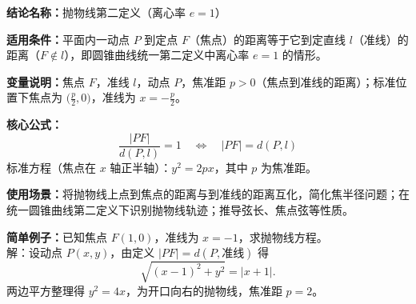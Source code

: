 \textbf{结论名称：}抛物线第二定义（离心率 \(e=1\)）

\textbf{适用条件：}平面内一动点 \(P\) 到定点 \(F\)（焦点）的距离等于它到定直线 \(l\)（准线）的距离（\(F\notin l\)），即圆锥曲线统一第二定义中离心率 \(e=1\) 的情形。

\textbf{变量说明：}焦点 \(F\)，准线 \(l\)，动点 \(P\)，焦准距 \(p>0\)（焦点到准线的距离）；标准位置下焦点为 \(\bigl(\frac{p}{2},0\bigr)\)，准线为 \(x=-\frac{p}{2}\)。

\textbf{核心公式：}
\[
\boxed{\frac{|PF|}{d(P,l)} = 1 \quad\Longleftrightarrow\quad |PF| = d(P,l)}
\]
标准方程（焦点在 \(x\) 轴正半轴）：\(y^2 = 2px\)，其中 \(p\) 为焦准距。

\textbf{使用场景：}将抛物线上点到焦点的距离与到准线的距离互化，简化焦半径问题；在统一圆锥曲线第二定义下识别抛物线轨迹；推导弦长、焦点弦等性质。

\textbf{简单例子：}已知焦点 \(F(1,0)\)，准线为 \(x=-1\)，求抛物线方程。\\
解：设动点 \(P(x,y)\)，由定义 \(|PF|=d(P,\text{准线})\) 得
\[
\sqrt{(x-1)^2+y^2} = |x+1|.
\]
两边平方整理得 \(y^2=4x\)，为开口向右的抛物线，焦准距 \(p=2\)。